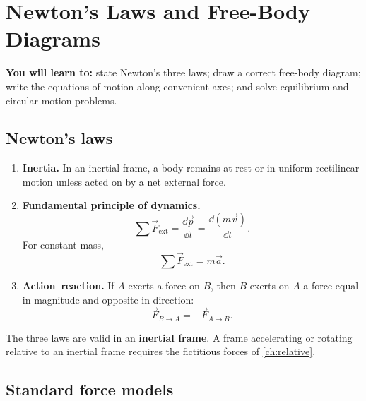 \chapter{Newton's Laws and Free-Body Diagrams}
\label{ch:newton}
\begin{chapterintro}
\textbf{You will learn to:} state Newton's three laws; draw a correct free-body
diagram; write the equations of motion along convenient axes; and solve
equilibrium and circular-motion problems.
\end{chapterintro}

\section{Newton's laws}

\begin{enumerate}[leftmargin=1.7em,itemsep=4pt]
  \item \textbf{Inertia.} In an inertial frame, a body remains at rest or in
        uniform rectilinear motion unless acted on by a net external force.
  \item \textbf{Fundamental principle of dynamics.}
        \[
        \sum\vec F_{\text{ext}}
        =\frac{\dd\vec p}{\dd t}
        =\frac{\dd(m\vec v)}{\dd t}.
        \]
        For constant mass,
        \[
        \boxed{\sum\vec F_{\text{ext}}=m\vec a.}
        \]
  \item \textbf{Action--reaction.} If $A$ exerts a force on $B$, then $B$ exerts
        on $A$ a force equal in magnitude and opposite in direction:
        \[
        \vec F_{B\to A}=-\vec F_{A\to B}.
        \]
\end{enumerate}

The three laws are valid in an \textbf{inertial frame}. A frame accelerating or
rotating relative to an inertial frame requires the fictitious forces of
\cref{ch:relative}.

\section{Standard force models}

